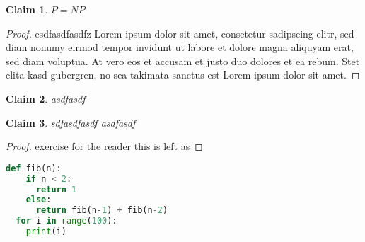 \documentclass{article}[11pt]
\theoremstyle{plain}%
\newtheorem{protoclaim}{Claim}[section]
\newenvironment{clm}
{\begin{tcolorbox}[colback=green!15!white,colframe=green!35!black]\begin{protoclaim}}
{\end{protoclaim}\end{tcolorbox}}
\theoremstyle{definition}
\begin{document}
\begin{clm}
 $P=NP$
\end{clm}
\begin{proof}
esdfasdfasdfz  
Lorem ipsum dolor sit amet, consetetur sadipscing elitr, sed diam
nonumy eirmod tempor invidunt ut labore et dolore magna aliquyam
erat, sed diam voluptua. At vero eos et accusam et justo duo
dolores et ea rebum. Stet clita kasd gubergren, no sea takimata
sanctus est Lorem ipsum dolor sit amet.
\end{proof}

\begin{clm}
  asdfasdf
\end{clm}

\begin{clm}
 sdfasdfasdf asdfasdf
\end{clm}
\begin{proof}
  exercise for the reader this is left as
\end{proof}

\begin{lstlisting}[language=python]
  def fib(n):
    if n < 2:
      return 1
    else:
      return fib(n-1) + fib(n-2)
  for i in range(100):
    print(i)
\end{lstlisting}
\end{document}
